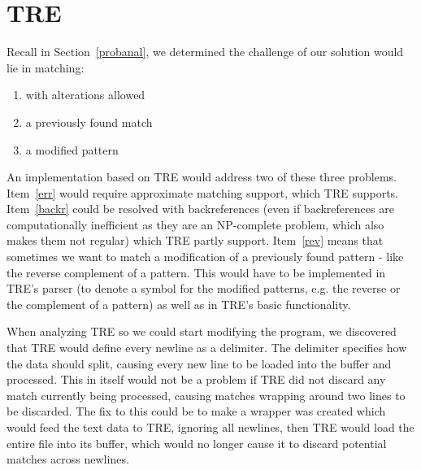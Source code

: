 \section{TRE}\label{tre}
Recall in Section~\ref{probanal}, we determined the challenge of our 
solution would lie in matching:
\begin{enumerate}
\item \label{err} with alterations allowed
\item \label{backr} a previously found match 
\item \label{rev} a modified pattern
\end{enumerate}
An implementation based on TRE would address two of these three 
problems. Item~\ref{err} would require approximate matching support, which 
TRE supports. Item~\ref{backr} could be resolved 
with backreferences (even if backreferences are computationally inefficient as 
they are an NP-complete problem, which also makes them not regular) 
which TRE partly support. Item~\ref{rev} means that sometimes we want to 
match a modification of a previously found pattern - like the reverse 
complement of a pattern. This would have to be implemented in TRE's parser 
(to denote a symbol for the modified patterns, e.g. the reverse or the 
complement of a pattern) as 
well as in TRE's basic functionality.

When analyzing TRE so we could start modifying the 
program, we discovered that TRE would define every newline as a delimiter. The 
delimiter specifies how the data should split, causing every new line 
to be loaded into the buffer and processed. This in 
itself would not be a problem if TRE did not discard any match currently being 
processed, causing matches wrapping around two 
lines to be discarded. The fix to this could be to make a wrapper 
was created which would feed the text data to TRE, 
ignoring all newlines, then TRE would load the entire file into its buffer, 
which would no longer cause it to discard potential matches across newlines.

